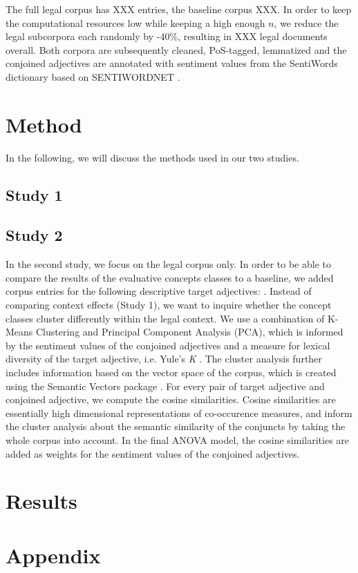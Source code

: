 \documentclass{article}
\begin{document}
The full legal corpus has XXX entries, the baseline corpus XXX. In order to keep the computational resources low while keeping a high enough $n$, we reduce the legal subcorpora each randomly by -40\%, resulting in XXX legal documents overall. Both corpora are subsequently cleaned, PoS-tagged, lemmatized and the conjoined adjectives are annotated with sentiment values from the SentiWords dictionary based on SENTIWORDNET \citep{Esuli2006, Baccianella2010, Guerini2013, Gatti2016}.

\section{Method}

In the following, we will discuss the methods used in our two studies.

\subsection{Study 1}



\subsection{Study 2}

In the second study, we focus on the legal corpus only. In order to be able to compare the results of the evaluative concepts classes to a baseline, we added corpus entries for the following descriptive target adjectives: . Instead of comparing context effects (Study 1), we want to inquire whether the concept classes cluster differently within the legal context. We use a combination of K-Means Clustering and Principal Component Analysis (PCA), which is informed by the sentiment values of the conjoined adjectives and a measure for lexical diversity of the target adjective, i.e. Yule's \textit{K} \citep{Yule1944, Tweedie1998}. The cluster analysis further includes information based on the vector space of the corpus, which is created using the Semantic Vectors package \citep{Widdows2008, Widdows2010, Widdows2016}. For every pair of target adjective and conjoined adjective, we compute the cosine similarities. Cosine similarities are essentially high dimensional representations of co-occurence measures, and inform the cluster analysis about the semantic similarity of the conjuncts by taking the whole corpus into account. In the final ANOVA model, the cosine similarities are added as weights for the sentiment values of the conjoined adjectives.

\section{Results}




\section{Appendix}
\label{sec:appendix}
\end{document}
